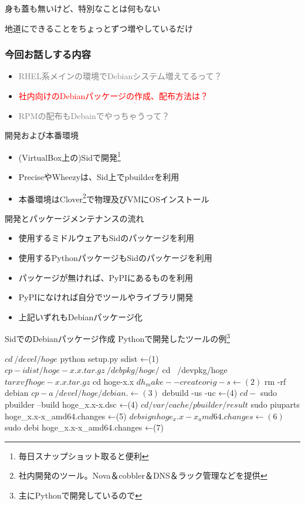 \begin{frame}{身も蓋も無いけど、特別なことは何もない}
\begin{center}
{\Huge 地道にできることをちょっとずつ増やしているだけ}
\end{center}
\end{frame}


\begin{frame}
  \frametitle{今回お話しする内容}
  \begin{itemize}
  \item \textcolor{gray}{RHEL系メインの環境でDebianシステム増えてるって？}
  \item \textcolor{red}{社内向けのDebianパッケージの作成、配布方法は？}
  \item \textcolor{gray}{RPMの配布もDebainでやっちゃうって？}
  \end{itemize}
\end{frame}

\begin{frame}{開発および本番環境}
  \begin{itemize}
    \item (VirtualBox上の)Sidで開発\footnote{毎日スナップショット取ると便利}
    \item PreciseやWheezyは、Sid上でpbuilderを利用
    \item 本番環境はClover\footnote{社内開発のツール。Nova＆cobbler＆DNS＆ラック管理などを提供}で物理及びVMにOSインストール
  \end{itemize}
\end{frame}

\begin{frame}{開発とパッケージメンテナンスの流れ}
  \begin{itemize}
    \item[1.] 使用するミドルウェアもSidのパッケージを利用
    \item[2.] 使用するPythonパッケージもSidのパッケージを利用
    \item[3.] パッケージが無ければ、PyPIにあるものを利用
    \item[4.] PyPIになければ自分でツールやライブラリ開発
    \item[5.] 上記いずれもDebianパッケージ化
  \end{itemize}
\end{frame}

\begin{frame}[containsverbatim]{SidでのDebianパッケージ作成}
Pythonで開発したツールの例\footnote{主にPythonで開発しているので}
  \begin{commandline}
$ cd ~/devel/hoge
$ python setup.py sdist ←(1)
$ cp -i dist/hoge-x.x.tar.gz ~/debpkg/hoge/
$ cd ~/devpkg/hoge
$ tar xvf hoge-x.x.tar.gz
$ cd hoge-x.x
$ dh_make --createorig -s ←(2)
$ rm -rf debian
$ cp -a ~/devel/hoge/debian . ←(3)
$ debuild -us -uc ←(4)
$ cd -
$ sudo pbuilder --build hoge_x.x-x.dsc ←(4)
$ cd /var/cache/pbuilder/result
$ sudo piuparts hoge_x.x-x_amd64.changes ←(5)
$ debsign hoge_x.x-x_amd64.changes ←(6)
$ sudo debi hoge_x.x-x_amd64.changes ←(7)
  \end{commandline}
\end{frame}

